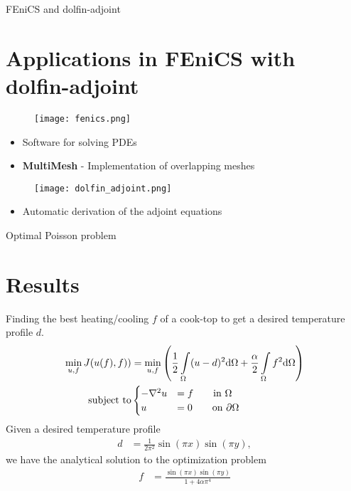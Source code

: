 \documentclass[mathserif]{beamer}
\begin{document}
\begin{frame}{FEniCS and dolfin-adjoint\section[Applications]{Applications in FEniCS with dolfin-adjoint}}
  \begin{figure}
    \texttt{[image: fenics.png]}
  \end{figure}
  \begin{itemize}
  \item Software for solving PDEs
  \item \textbf{MultiMesh} - Implementation of overlapping meshes
  \end{itemize}
  \begin{figure}
    \texttt{[image: dolfin\_adjoint.png]}
  \end{figure}
  \begin{itemize}
  \item Automatic derivation of the adjoint equations
  \end{itemize}
\end{frame}

\begin{frame}{Optimal Poisson problem\section[Results]{Results}}
  Finding the best heating/cooling $f$ of a cook-top to get a
  desired temperature profile $d$.
  \begin{align*}
    \min_{u,f}J(u(f),f))&=\min_{u,f}\left(\frac{1}{2}\int\limits_{ \Omega}^{}(u-d)^2\mathrm{d}\Omega
    + \frac{\alpha}{2}\int\limits_{ \Omega}^{}f^2\mathrm{d}\Omega\right)\\
    \text{subject to}&
    \begin{cases}
      -\nabla^2 u &= f\qquad \text{in }\Omega\\
      u&=0 \qquad\text{on }\partial\Omega\\
    \end{cases}
  \end{align*}
  Given a desired temperature profile
  \begin{align*}
    d&=\frac{1}{2\pi^2}\sin(\pi x)\sin(\pi y),
  \end{align*}
  we have the analytical solution to the optimization problem
  \begin{align*}
    f &= \frac{\sin(\pi x)\sin(\pi y)}{1 + 4\alpha \pi^4}
  \end{align*}

\end{frame}
\end{document}
